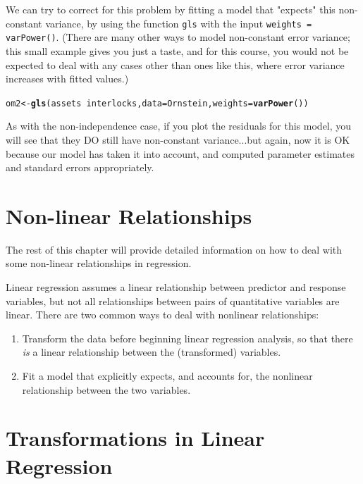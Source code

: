 \documentclass[twoside]{book}\usepackage[]{graphicx}\usepackage[]{xcolor}
\makeatletter
\newcommand{\hlopt}[1]{\textcolor[rgb]{0,0,0}{#1}}%
\newcommand{\hlstd}[1]{\textcolor[rgb]{0.345,0.345,0.345}{#1}}%
\newcommand{\hlkwb}[1]{\textcolor[rgb]{0.69,0.353,0.396}{#1}}%
\newcommand{\hlkwc}[1]{\textcolor[rgb]{0.333,0.667,0.333}{#1}}%
\newcommand{\hlkwd}[1]{\textcolor[rgb]{0.737,0.353,0.396}{\textbf{#1}}}%
\newenvironment{kframe}{%
 \def\at@end@of@kframe{}%
 \ifinner\ifhmode%
  \def\at@end@of@kframe{\end{minipage}}%
  \begin{minipage}{\columnwidth}%
 \fi\fi%
 \def\FrameCommand##1{\hskip\@totalleftmargin \hskip-\fboxsep
 \colorbox{shadecolor}{##1}\hskip-\fboxsep
     \hskip-\linewidth \hskip-\@totalleftmargin \hskip\columnwidth}%
 \MakeFramed {\advance\hsize-\width
   \@totalleftmargin\z@ \linewidth\hsize
   \@setminipage}}%
 {\par\unskip\endMakeFramed%
 \at@end@of@kframe}
\newenvironment{knitrout}{}{} %
\def\myindex#1{\index{#1}}
\newcounter{example}[section]
\makeatother
\begin{document}
We can try to correct for this problem by fitting a model that "expects" this non-constant variance, by using the function \texttt{gls} with the input \texttt{weights = varPower()}.  (There are many other ways to model non-constant error variance; this small example gives you just a taste, and for this course, you would not be expected to deal with any cases other than ones like this, where error variance increases with fitted values.)
\begin{knitrout}
\color{fgcolor}\begin{kframe}
\begin{alltt}
\hlstd{om2} \hlkwb{<-} \hlkwd{gls}\hlstd{(assets} \hlopt{~} \hlstd{interlocks,} \hlkwc{data} \hlstd{= Ornstein,} \hlkwc{weights} \hlstd{=} \hlkwd{varPower}\hlstd{())}
\end{alltt}
\end{kframe}
\end{knitrout}

As with the non-independence case, if you plot the residuals for this model, you will see that they DO still have non-constant variance...but again, now it is OK because our model has taken it into account, and computed parameter estimates and standard errors appropriately.

\section{Non-linear Relationships}
The rest of this chapter will provide detailed information on how to deal with some non-linear relationships in regression.

Linear regression assumes a linear relationship between predictor and response variables, but not all relationships between pairs of quantitative variables are linear.  There are two common ways to deal with
nonlinear relationships:
\begin{enumerate}
	\item
		Transform the data before beginning linear regression analysis, so that there \emph{is} a linear relationship between the (transformed) variables.
	\item
		Fit a model that explicitly expects, and accounts for, the nonlinear relationship between the two variables. 
\end{enumerate}


\section{Transformations in Linear Regression}
\myindex{transformation!of data}%
\end{document}
